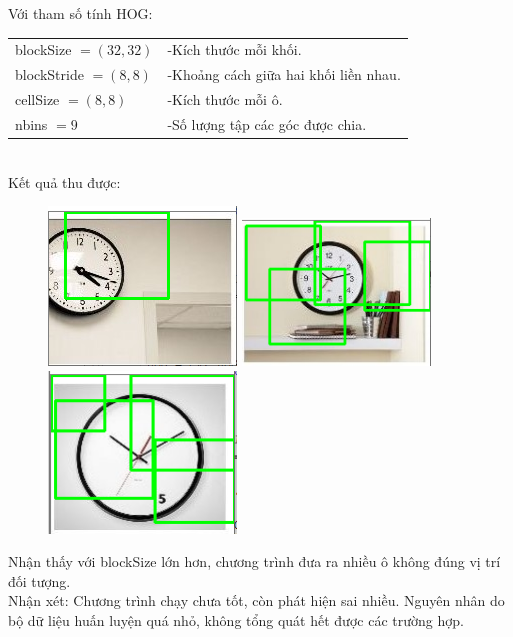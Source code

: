 \documentclass[../report.tex]{subfiles}
\begin{document}
\noindent Với tham số tính HOG: \\[3mm]
\begin{tabular}{|l l|}
\hline
blockSize $= (32, 32)$  &-Kích thước mỗi khối. \\
blockStride $= (8, 8)$  &-Khoảng cách giữa hai khối liền nhau.  \\
cellSize $= (8, 8)$     &-Kích thước mỗi ô. \\
nbins $= 9$             &-Số lượng tập các góc được chia. \\
\hline
\end{tabular} \\[3mm]
Kết quả thu được:
\begin{figure}[H]
\centering
\includegraphics[width=5cm]{figures/test-4-1.png}
\includegraphics[width=5cm]{figures/test-4-2.png}
\includegraphics[width=5cm]{figures/test-4-3.png}
\end{figure}
\noindent Nhận thấy với blockSize lớn hơn, 
chương trình đưa ra nhiều ô không đúng vị trí đối tượng. \\[5mm]
Nhận xét: Chương trình chạy chưa tốt, còn phát hiện sai nhiều. 
Nguyên nhân do bộ dữ liệu huấn luyện quá nhỏ, 
không tổng quát hết được các trường hợp.
\end{document}
